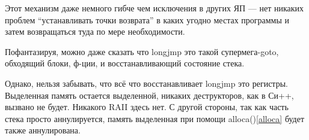 Этот механизм даже немного гибче чем исключения в других ЯП --- нет никаких проблем ``устанавливать точки 
возврата'' в каких угодно местах программы и затем возвращаться туда по мере необходимости.

\label{goto}
Пофантазируя, можно даже сказать что longjmp это такой супермега-goto, обходящий блоки, ф-ции, и восстанавливающий
состояние стека.

Однако, нельзя забывать, что всё что восстанавливает longjmp это регистры. Выделенная память остается выделенной,
никаких деструкторов, как в Си++, вызвано не будет. Никакого \ac{RAII} здесь нет. 
С другой стороны, так как часть стека просто аннулируется, 
память выделенная при помощи alloca()\ref{alloca} будет также аннулирована.

